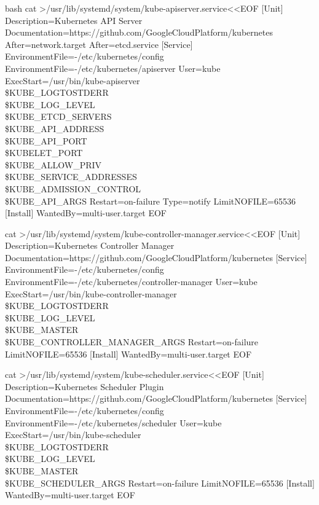 \begin{code-block}{bash}
cat >/usr/lib/systemd/system/kube-apiserver.service<<EOF
[Unit]
Description=Kubernetes API Server
Documentation=https://github.com/GoogleCloudPlatform/kubernetes
After=network.target
After=etcd.service
[Service]
EnvironmentFile=-/etc/kubernetes/config
EnvironmentFile=-/etc/kubernetes/apiserver
User=kube
ExecStart=/usr/bin/kube-apiserver \\
            \$KUBE_LOGTOSTDERR \\
            \$KUBE_LOG_LEVEL \\
            \$KUBE_ETCD_SERVERS \\
            \$KUBE_API_ADDRESS \\
            \$KUBE_API_PORT \\
            \$KUBELET_PORT \\
            \$KUBE_ALLOW_PRIV \\
            \$KUBE_SERVICE_ADDRESSES \\
            \$KUBE_ADMISSION_CONTROL \\
            \$KUBE_API_ARGS
Restart=on-failure
Type=notify
LimitNOFILE=65536
[Install]
WantedBy=multi-user.target
EOF

cat >/usr/lib/systemd/system/kube-controller-manager.service<<EOF
[Unit]
Description=Kubernetes Controller Manager
Documentation=https://github.com/GoogleCloudPlatform/kubernetes
[Service]
EnvironmentFile=-/etc/kubernetes/config
EnvironmentFile=-/etc/kubernetes/controller-manager
User=kube
ExecStart=/usr/bin/kube-controller-manager \\
            \$KUBE_LOGTOSTDERR \\
            \$KUBE_LOG_LEVEL \\
            \$KUBE_MASTER \\
            \$KUBE_CONTROLLER_MANAGER_ARGS
Restart=on-failure
LimitNOFILE=65536
[Install]
WantedBy=multi-user.target
EOF

cat >/usr/lib/systemd/system/kube-scheduler.service<<EOF
[Unit]
Description=Kubernetes Scheduler Plugin
Documentation=https://github.com/GoogleCloudPlatform/kubernetes
[Service]
EnvironmentFile=-/etc/kubernetes/config
EnvironmentFile=-/etc/kubernetes/scheduler
User=kube
ExecStart=/usr/bin/kube-scheduler \\
            \$KUBE_LOGTOSTDERR \\
            \$KUBE_LOG_LEVEL \\
            \$KUBE_MASTER \\
            \$KUBE_SCHEDULER_ARGS
Restart=on-failure
LimitNOFILE=65536
[Install]
WantedBy=multi-user.target
EOF


\end{code-block}
